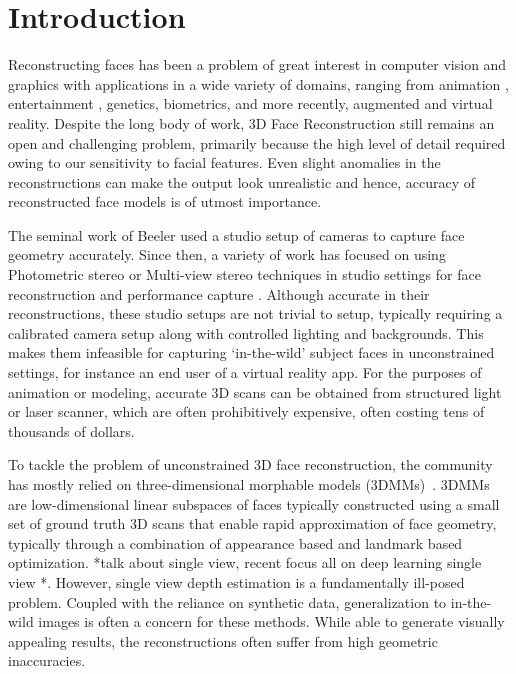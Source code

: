 \documentclass[10pt,twocolumn,letterpaper]{article}
\begin{document}
\section{Introduction}


Reconstructing faces has been a problem of great interest in computer vision and graphics with applications in a wide variety of domains, ranging from animation \cite{ichim2015dynamic}, entertainment \cite{saito2016real}, genetics, biometrics, and more recently, augmented and virtual reality. Despite the long body of work, 3D Face Reconstruction still remains an open and challenging problem, primarily because the high level of detail required owing to our sensitivity to facial features. Even slight anomalies in the reconstructions can make the output look unrealistic and hence, accuracy of reconstructed face models is of utmost importance.


The seminal work of Beeler \etal \cite{beeler2010high} used a studio setup of cameras to capture face geometry accurately. Since then, a variety of work has focused on using Photometric stereo or Multi-view stereo techniques in studio settings for face reconstruction and performance capture \cite{cao2018sparse, fyffe2017multi}. 
Although accurate in their reconstructions, these studio setups are not trivial to setup, typically requiring a calibrated camera setup along with controlled lighting and backgrounds. This makes them infeasible for capturing `in-the-wild' subject faces in unconstrained settings, for instance an end user of a virtual reality app. For the purposes of animation or modeling, accurate 3D scans can be obtained from structured light or laser scanner, which are often prohibitively expensive, often costing tens of thousands of dollars. 

To tackle the problem of unconstrained 3D face reconstruction, the community has mostly relied on three-dimensional morphable models (3DMMs)~\cite{blanz1999morphable}. 3DMMs are low-dimensional linear subspaces of faces typically constructed using a small set of ground truth 3D scans that enable rapid approximation of face geometry, typically through a combination of appearance based and landmark based optimization. *talk about single view, recent focus all on deep learning single view *. However, single view depth estimation is a fundamentally ill-posed problem. Coupled with the reliance on synthetic data, generalization to in-the-wild images is often a concern for these methods. While able to generate visually appealing results, the reconstructions often suffer from high geometric inaccuracies.
\end{document}

